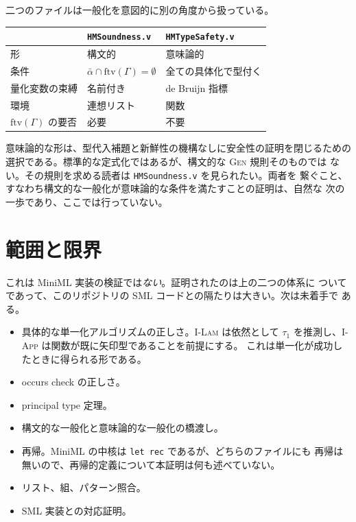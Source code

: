 \documentclass[11pt,a4paper]{ltjsarticle}
\newcommand{\ftv}{\mathrm{ftv}}
\begin{document}
二つのファイルは一般化を意図的に別の角度から扱っている。

\begin{center}
\begin{tabular}{lll}
  & \texttt{HMSoundness.v} & \texttt{HMTypeSafety.v} \\
  \hline
  形 & 構文的 & 意味論的 \\
  条件 & $\bar\alpha \cap \ftv(\Gamma) = \emptyset$
       & 全ての具体化で型付く \\
  量化変数の束縛 & 名前付き & de Bruijn 指標 \\
  環境 & 連想リスト & 関数 \\
  $\ftv(\Gamma)$ の要否 & 必要 & 不要 \\
\end{tabular}
\end{center}

意味論的な形は、型代入補題と新鮮性の機構なしに安全性の証明を閉じるための
選択である。標準的な定式化ではあるが、構文的な \textsc{Gen} 規則そのものでは
ない。その規則を求める読者は \texttt{HMSoundness.v} を見られたい。両者を
繋ぐこと、すなわち構文的な一般化が意味論的な条件を満たすことの証明は、自然な
次の一歩であり、ここでは行っていない。

\section{範囲と限界}
\label{sec:limits}

これは MiniML 実装の検証では\emph{ない}。証明されたのは上の二つの体系に
ついてであって、このリポジトリの SML コードとの隔たりは大きい。次は未着手で
ある。

\begin{itemize}
  \item 具体的な単一化アルゴリズムの正しさ。\textsc{I-Lam} は依然として
  $\tau_1$ を推測し、\textsc{I-App} は関数が既に矢印型であることを前提にする。
  これは単一化が成功したときに得られる形である。
  \item occurs check の正しさ。
  \item principal type 定理。
  \item 構文的な一般化と意味論的な一般化の橋渡し。
  \item 再帰。MiniML の中核は \texttt{let rec} であるが、どちらのファイルにも
  再帰は無いので、再帰的定義について本証明は何も述べていない。
  \item リスト、組、パターン照合。
  \item SML 実装との対応証明。
\end{itemize}
\end{document}
